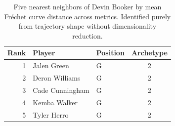 \begin{table}[htbp]
  \centering\small
  \begin{tabular}{rllc}
    \toprule
    Rank & Player & Position & Archetype \\
    \midrule
    1 & Jalen Green & G & 2 \\
    2 & Deron Williams & G & 2 \\
    3 & Cade Cunningham & G & 2 \\
    4 & Kemba Walker & G & 2 \\
    5 & Tyler Herro & G & 2 \\
    \bottomrule
  \end{tabular}
  \caption{Five nearest neighbors of Devin Booker by mean Fr\'{e}chet curve distance across metrics. Identified purely from trajectory shape without dimensionality reduction.}
  \label{tab:Devin_Booker_frechet_curve_neighbors}
\end{table}

